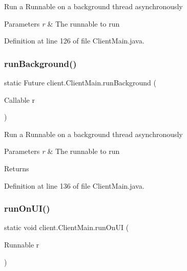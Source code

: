 Run a Runnable on a background thread asynchronously


\begin{DoxyParams}{Parameters}
{\em r} & The runnable to run \\
\hline
\end{DoxyParams}


Definition at line 126 of file Client\+Main.\+java.

\hypertarget{classclient_1_1_client_main_a0b66d467ed48a17869c86a90992937cc}{}\label{classclient_1_1_client_main_a0b66d467ed48a17869c86a90992937cc} 
\subsubsection{\texorpdfstring{run\+Background()}{runBackground()}\hspace{0.1cm}{\footnotesize\ttfamily [2/2]}}
{\footnotesize\ttfamily static Future client.\+Client\+Main.\+run\+Background (\begin{DoxyParamCaption}\item[{Callable}]{r }\end{DoxyParamCaption})\hspace{0.3cm}{\ttfamily [static]}}

Run a Runnable on a background thread asynchronously


\begin{DoxyParams}{Parameters}
{\em r} & The runnable to run \\
\hline
\end{DoxyParams}
\begin{DoxyReturn}{Returns}

\end{DoxyReturn}


Definition at line 136 of file Client\+Main.\+java.

\hypertarget{classclient_1_1_client_main_ad1c0bf16363beb967cc1a7a9a41a4e21}{}\label{classclient_1_1_client_main_ad1c0bf16363beb967cc1a7a9a41a4e21} 
\subsubsection{\texorpdfstring{run\+On\+U\+I()}{runOnUI()}}
{\footnotesize\ttfamily static void client.\+Client\+Main.\+run\+On\+UI (\begin{DoxyParamCaption}\item[{Runnable}]{r }\end{DoxyParamCaption})\hspace{0.3cm}{\ttfamily [static]}}

